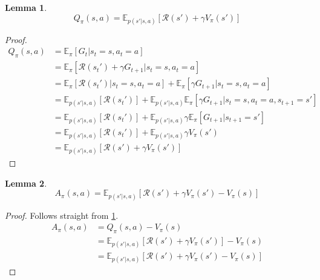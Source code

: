 \documentclass[10pt]{article}
\numberwithin{equation}{subsection}
\newcommand{\MR}{\ensuremath{\mathcal{R}}}
\newcommand{\E}{\ensuremath{\mathbb{E}}}
\newcommand{\mpi}{\ensuremath{\pi}\xspace}
\theoremstyle{plain}
\newtheorem{lemma}{Lemma}[subsection]
\theoremstyle{definition}
\begin{document}
\begin{lemma}
\label{qexp}
$$
Q_\mpi(s, a) = \E_{p(s'|s,a)} \left[ \MR(s') + \gamma V_\mpi(s') \right]
$$
\end{lemma}
\begin{proof}

\begin{align*}
Q_\mpi(s, a) 
&= \E_\mpi \left[ G_t | s_t = s, a_t = a \right]  \\
&= \E_\mpi \left[ \MR(s_t') + \gamma G_{t+1} | s_t = s, a_t = a \right]  \\
&= 
\E_\mpi \left[ \MR(s_t') | s_t = s, a_t = a \right]  
+ \E_\mpi \left[ \gamma G_{t+1} | s_t = s, a_t = a \right] \\
&= \E_{p(s'|s,a)} \left[ \MR(s_t') \right] 
+ \E_{p(s'|s,a)} \E_\mpi \left[ \gamma G_{t+1} | s_t = s, a_t = a, s_{t+1} = s' \right] \\
&= \E_{p(s'|s,a)} \left[ \MR(s_t') \right] 
+ \E_{p(s'|s,a)} \gamma \E_\mpi \left[ G_{t+1} | s_{t+1} = s' \right] \\
&= \E_{p(s'|s,a)} \left[ \MR(s_t') \right] 
+ \E_{p(s'|s,a)} \gamma V_\mpi(s') \\
&= \E_{p(s'|s,a)} \left[ \MR(s') + \gamma V_\mpi(s') \right]
\end{align*}

\end{proof}

\begin{lemma}
\label{aexp}
$$
A_\mpi(s, a) = \E_{p(s'|s,a)} \left[ \MR(s') + \gamma V_\mpi(s') - V_\mpi(s)  \right]
$$
\end{lemma}
\begin{proof}
Follows straight from \cref{qexp}.
\begin{align*}
A_\mpi(s, a) &= Q_\mpi(s, a) - V_\mpi(s) \\
&= \E_{p(s'|s,a)} \left[ \MR(s') + \gamma V_\mpi(s') \right] - V_\mpi(s) \\
&= \E_{p(s'|s,a)} \left[ \MR(s') + \gamma V_\mpi(s') - V_\mpi(s)  \right]
\end{align*}
\end{proof}
\end{document}
